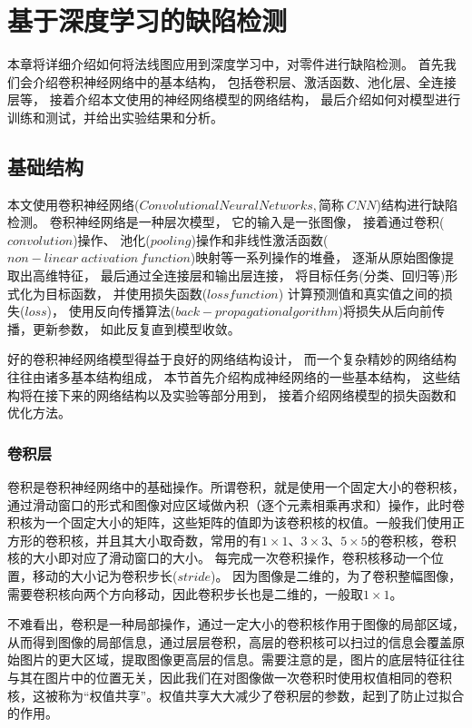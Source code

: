 \chapter{基于深度学习的缺陷检测}


本章将详细介绍如何将法线图应用到深度学习中，对零件进行缺陷检测。
首先我们会介绍卷积神经网络中的基本结构，
包括卷积层、激活函数、池化层、全连接层等，
接着介绍本文使用的神经网络模型的网络结构，
最后介绍如何对模型进行训练和测试，并给出实验结果和分析。

\section{基础结构}

本文使用卷积神经网络($Convolutional Neural Networks,\mbox{简称}~CNN$)结构进行缺陷检测。
卷积神经网络是一种层次模型，
它的输入是一张图像，
接着通过卷积($convolution$)操作、
池化\cite{chechik1998synaptic}($pooling$)操作和非线性激活函数($non-linear~activation~function$)映射等一系列操作的堆叠，
逐渐从原始图像提取出高维特征，
最后通过全连接层和输出层连接，
将目标任务(分类、回归等)形式化为目标函数，
并使用损失函数($loss function$)
计算预测值和真实值之间的损失($loss$)，
使用反向传播算法\cite{周志华2016机器学习}($back-propagation algorithm$)将损失从后向前传播，更新参数，
如此反复直到模型收敛。

好的卷积神经网络模型得益于良好的网络结构设计，
而一个复杂精妙的网络结构往往由诸多基本结构组成，
本节首先介绍构成神经网络的一些基本结构，
这些结构将在接下来的网络结构以及实验等部分用到，
接着介绍网络模型的损失函数和优化方法。

\subsection{卷积层}

卷积是卷积神经网络中的基础操作。所谓卷积，就是使用一个固定大小的卷积核，通过滑动窗口的形式和图像对应区域做內积（逐个元素相乘再求和）操作，此时卷积核为一个固定大小的矩阵，这些矩阵的值即为该卷积核的权值。一般我们使用正方形的卷积核，并且其大小取奇数，常用的有$1\times 1$、$3\times 3$、$5\times 5$的卷积核，卷积核的大小即对应了滑动窗口的大小。
每完成一次卷积操作，卷积核移动一个位置，移动的大小记为卷积步长($stride$)。
因为图像是二维的，为了卷积整幅图像，需要卷积核向两个方向移动，因此卷积步长也是二维的，一般取$1\times 1$。

不难看出，卷积是一种局部操作，通过一定大小的卷积核作用于图像的局部区域，从而得到图像的局部信息，通过层层卷积，高层的卷积核可以扫过的信息会覆盖原始图片的更大区域，提取图像更高层的信息。需要注意的是，图片的底层特征往往与其在图片中的位置无关，因此我们在对图像做一次卷积时使用权值相同的卷积核，这被称为“权值共享”。权值共享大大减少了卷积层的参数，起到了防止过拟合的作用。

